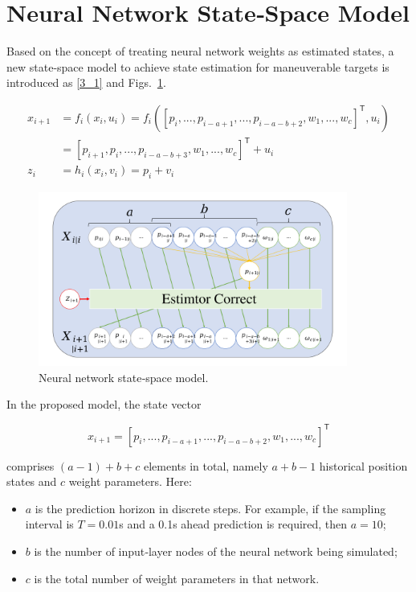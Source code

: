 \documentclass[sn-nature]{sn-jnl}%
\theoremstyle{thmstyleone}%
\theoremstyle{thmstyletwo}%
\theoremstyle{thmstylethree}%
\begin{document}
\section{Neural Network State‐Space Model}\label{sec3}

Based on the concept of treating neural network weights as estimated states, a new state-space model to achieve state estimation for maneuverable targets is introduced as \eqref{3_1} and Figs.~\ref{fig:NNSSM}.

\noindent
\begin{equation}
\begin{aligned}
{x_{i + 1}} &= {f_i}({x_i},{u_i}) = {f_i}({\left[ {{p_i},...,{p_{i-a+1}},...,{p_{i-a-b+2}},{w_{1}},...,{w_{c}}} \right]^{\!\mathsf T}},{u_i})\\
 &= \left[ {{p_{i + 1}},{p_i},...,{p_{i-a-b+3}},{w_{1}},...,{w_{c}}} \right]^{\!\mathsf T} + {u_i}\\
{z_i} &= {h_i}({x_i},{v_i}) = {p_i} + {v_i}
\end{aligned}
\label{3_1}
\end{equation}

\begin{figure}[!t]
  \centering
  \includegraphics[width=4in]{fig/fig3_1.png}
  \caption{Neural network state‐space model.}
  \label{fig:NNSSM}
\end{figure}

In the proposed model, the state vector

\noindent
\begin{equation}
{x_{i + 1}} = \left[ {{p_i},...,{p_{i-a+1}},...,{p_{i-a-b+2}},{w_{1}},...,{w_{c}}} \right]^{\!\mathsf T}
\label{3_2}
\end{equation}

\noindent
comprises \((a-1)+b+c\) elements in total, namely \(a+b-1\) historical position states and \(c\) weight parameters. Here:
\begin{itemize}
  \item \(a\) is the prediction horizon in discrete steps.  For example, if the sampling interval is \(T=0.01\)s and a 0.1s ahead prediction is required, then \(a = 10\);
  \item \(b\) is the number of input‐layer nodes of the neural network being simulated;
  \item \(c\) is the total number of weight parameters in that network.
\end{itemize}
\end{document}
